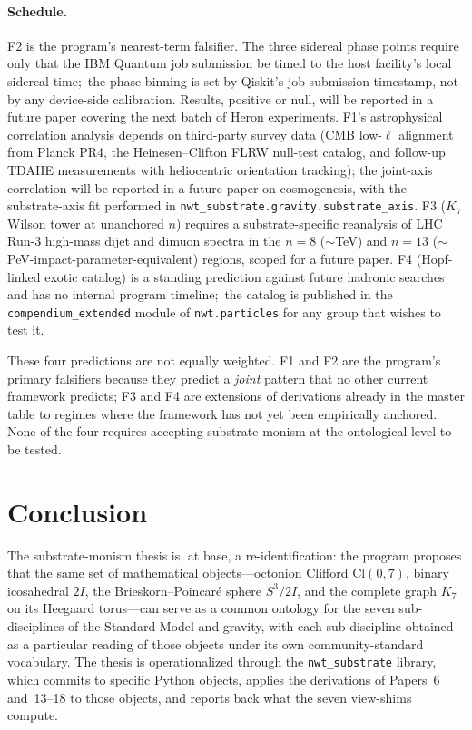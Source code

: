 \documentclass[11pt]{article}
\newcommand{\nwtsub}{\texttt{nwt\_substrate}}
\begin{document}
\paragraph{Schedule.}  F2 is the program's nearest-term
falsifier.  The three sidereal phase points require only that
the IBM Quantum job submission be timed to the host facility's
local sidereal time;\ the phase binning is set by Qiskit's
job-submission timestamp, not by any device-side calibration.
Results, positive or null, will be reported in a future paper
covering the next batch of Heron experiments.  F1's
astrophysical correlation analysis depends on third-party
survey data (CMB low-$\ell$ alignment from Planck PR4, the
Heinesen--Clifton FLRW null-test catalog, and follow-up
TDAHE measurements with heliocentric orientation tracking);
the joint-axis correlation will be reported in a future paper
on cosmogenesis, with the substrate-axis fit performed in
\texttt{nwt\_substrate.gravity.substrate\_axis}.  F3 ($K_7$
Wilson tower at unanchored $n$) requires a substrate-specific
reanalysis of LHC Run-3 high-mass dijet and dimuon spectra in
the $n = 8$ ($\sim$TeV) and $n = 13$
($\sim$PeV-impact-parameter-equivalent) regions, scoped for
a future paper.  F4 (Hopf-linked exotic catalog) is a standing
prediction against future hadronic searches and has no internal
program timeline;\ the catalog is published in the
\texttt{compendium\_extended} module of \texttt{nwt.particles}
for any group that wishes to test it.

These four predictions are not equally weighted.  F1 and F2 are
the program's primary falsifiers because they predict a
\emph{joint} pattern that no other current framework predicts;
F3 and F4 are extensions of derivations already in the master
table to regimes where the framework has not yet been
empirically anchored.  None of the four requires accepting
substrate monism at the ontological level to be tested.

\section{Conclusion}
\label{sec:conclusion}

The substrate-monism thesis is, at base, a re-identification:
the program proposes that the same set of mathematical
objects---octonion Clifford $\mathrm{Cl}(0,7)$, binary
icosahedral $2I$, the Brieskorn--Poincar\'e sphere $S^3/2I$,
and the complete graph $K_7$ on its Heegaard torus---can serve
as a common ontology for the seven sub-disciplines of the
Standard Model and gravity, with each sub-discipline obtained
as a particular reading of those objects under its own
community-standard vocabulary.  The thesis is operationalized
through the \nwtsub{} library, which commits to specific Python
objects, applies the derivations of Papers~6 and~13--18 to those
objects, and reports back what the seven view-shims compute.
\end{document}
